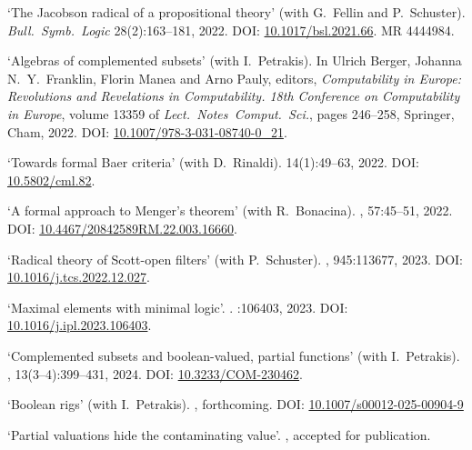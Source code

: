 \documentclass[a4paper]{article}
\begin{document}
\begin{flushleft}
\begin{thebibliography}{10}
\newblock `The {J}acobson radical of a propositional theory' (with G.~Fellin and P.~Schuster).
\newblock \emph{Bull.~Symb.~Logic} 28(2):163--181, 2022.
\newblock DOI: \href{https://doi.org/10.1017/bsl.2021.66}{10.1017/bsl.2021.66}.
\newblock MR 4444984.

\newblock `Algebras of complemented subsets' (with I.~Petrakis).
\newblock  In Ulrich Berger, Johanna N.~Y.~Franklin, Florin Manea and Arno Pauly, editors, {\em Computability in Europe: Revolutions and Revelations in Computability. 18th Conference on Computability in Europe},
\newblock volume 13359 of {\em Lect.~Notes~Comput.~Sci.}, pages 246--258, Springer, Cham, 2022.
\newblock DOI: \href{https://doi.org/10.1007/978-3-031-08740-0_21}{10.1007/978-3-031-08740-0\_21}.

\newblock `Towards formal Baer criteria' (with D.~Rinaldi).
 14(1):49--63, 2022.
\newblock DOI: \href{https://doi.org/10.5802/cml.82}{10.5802/cml.82}.

\newblock `A formal approach to Menger's theorem' (with R.~Bonacina).
, 57:45--51, 2022.
\newblock DOI: \href{https://doi.org/10.4467/20842589RM.22.003.16660}{10.4467/20842589RM.22.003.16660}.

\newblock `Radical theory of Scott-open filters' (with P.~Schuster).
, 945:113677, 2023.
\newblock DOI: \href{https://doi.org/10.1016/j.tcs.2022.12.027}{10.1016/j.tcs.2022.12.027}.

\newblock `Maximal elements with minimal logic'.
.
:106403, 2023.
\newblock DOI: \href{https://doi.org/10.1016/j.ipl.2023.106403}{10.1016/j.ipl.2023.106403}.

\newblock `Complemented subsets and boolean-valued, partial functions' (with I.~Petrakis).
, 13(3--4):399--431, 2024.
\newblock DOI: \href{https://doi.org/10.3233/COM-230462}{10.3233/COM-230462}.

\newblock `Boolean rigs' (with I.~Petrakis).
, forthcoming.
\newblock DOI: \href{}{10.1007/s00012-025-00904-9}

\newblock `Partial valuations hide the contaminating value'.
, accepted for publication.


\end{thebibliography}


\end{flushleft}
\end{document}
